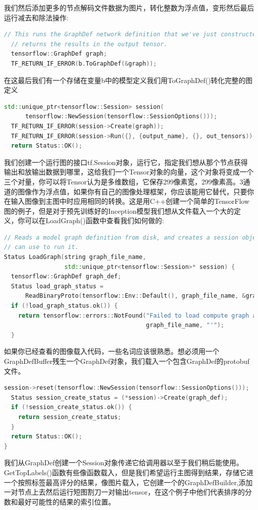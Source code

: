 我们然后添加更多的节点解码文件数据为图片，转化整数为浮点值，变形然后最后运行减去和除法操作:
\begin{lstlisting}[language=C++]
  // This runs the GraphDef network definition that we've just constructed, and
  // returns the results in the output tensor.
  tensorflow::GraphDef graph;
  TF_RETURN_IF_ERROR(b.ToGraphDef(&graph));
\end{lstlisting}
在这最后我们有一个存储在变量b中的模型定义我们用ToGraphDef()转化完整的图定义
\begin{lstlisting}[language=C++]
  std::unique_ptr<tensorflow::Session> session(
      tensorflow::NewSession(tensorflow::SessionOptions()));
  TF_RETURN_IF_ERROR(session->Create(graph));
  TF_RETURN_IF_ERROR(session->Run({}, {output_name}, {}, out_tensors));
  return Status::OK();
\end{lstlisting}
我们创建一个运行图的接口tf.Session对象，运行它，指定我们想从那个节点获得输出和放输出数据到哪里，这给我们一个Tensor对象的向量，这个对象将变成一个三个对量，你可以将Tensor认为是多维数组，它保存299像素宽，299像素高。3通道的图像作为浮点值，如果你有自己的图像处理框架，你应该能用它替代，只要你在输入图像到主图中时应用相同的转换。这是用C++创建一个简单的TensorFlow图的例子，但是对于预先训练好的Inception模型我们想从文件载入一个大的定义，你可以在LoadGraph()函数中查看我们如何做的:
\begin{lstlisting}[language=C++]
// Reads a model graph definition from disk, and creates a session object you
// can use to run it.
Status LoadGraph(string graph_file_name,
                 std::unique_ptr<tensorflow::Session>* session) {
  tensorflow::GraphDef graph_def;
  Status load_graph_status =
      ReadBinaryProto(tensorflow::Env::Default(), graph_file_name, &graph_def);
  if (!load_graph_status.ok()) {
    return tensorflow::errors::NotFound("Failed to load compute graph at '",
                                        graph_file_name, "'");
  }
\end{lstlisting}
如果你已经查看的图像载入代码，一些名词应该很熟悉。想必须用一个GraphDefBuffer残生一个GraphDef对象，我们载入一个包含GraphDef的protobuf文件。
\begin{lstlisting}[language=C++]
  session->reset(tensorflow::NewSession(tensorflow::SessionOptions()));
  Status session_create_status = (*session)->Create(graph_def);
  if (!session_create_status.ok()) {
    return session_create_status;
  }
  return Status::OK();
}
\end{lstlisting}
我们从GraphDef创建一个Session对象传递它给调用器以至于我们稍后能使用。GetTopLabels()函数有些像函数载入，但是我们希望运行主图得到结果，存储它进一个按照标签最高评分的结果，像图片载入，它创建一个的GraphDefBuilder,添加一对节点上去然后运行短图割刀一对输出tensor，在这个例子中他们代表排序的分数和最好可能性的结果的索引位置。
